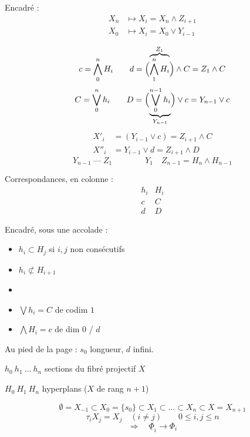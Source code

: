 \documentclass[11pt,a4paper]{article}
\begin{document}
Encadré :
\[
\begin{aligned}
X_n &\longmapsto X_i = X_n \wedge Z_{i+1} \\
X_0 &\longmapsto X_i = X_0 \vee Y_{i-1}
\end{aligned}
\]

\[
c = \bigwedge_0^n H_i \qquad d = \Bigl(\overbrace{\bigwedge_1^n H_i}^{Z_1}\Bigr) \wedge C = Z_1 \wedge C
\]
\[
C = \bigvee_0^n h_i \qquad D = \Bigl(\underbrace{\bigvee_0^{n-1} h_i}_{Y_{n-1}}\Bigr) \vee c = Y_{n-1} \vee c
\]
\[
\begin{aligned}
X'_i &= (Y_{i-1} \vee c) = Z_{i+1} \wedge C \\
X''_i &= Y_{i-1} \vee d = Z_{i+1} \wedge D
\end{aligned}
\]
\[
Y_{n-1} \ \text{---}\ Z_1 \qquad\qquad Y_1 \quad Z_{n-1} = H_n \wedge H_{n-1}
\]

Correspondances, en colonne :
\[
\begin{array}{cc}
h_i & H_i \\
c & C \\
d & D
\end{array}
\]

Encadré, sous une accolade :
\begin{itemize}
\item $h_i \subset H_j$ si $i, j$ non consécutifs
\item $h_i \not\subset H_{i+1}$
\item {}
\item $\bigvee h_i = C$ de codim $1$
\item $\bigwedge H_i = c$ de dim $0$ / $d$
\end{itemize}

Au pied de la page : $s_0$ longueur, $d$ infini.

\struck{\ill{}}
$h_0\ h_1\ \dots\ h_n$ sections du fibré projectif $X$

$H_0\ H_1\ H_n$ hyperplans ($X$ de rang $n+1$)

\[
\emptyset = X_{-1} \subset X_0 = \{s_0\} \subset X_1 \subset \dots \subset X_n \subset X = X_{n+1}
\]
\[
\tau_i X_j = X_j \quad (i \neq j) \qquad 0 \leq i, j \leq n
\]
\[
\Longrightarrow \quad \underline{\Phi}_i \to \Phi_i
\]
\end{document}
